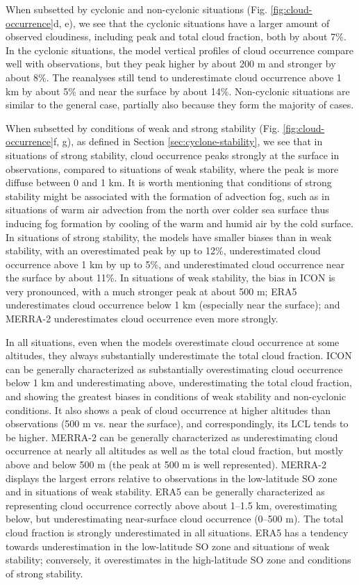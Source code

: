 \documentclass[draft]{agujournal2019}
\begin{document}
When subsetted by cyclonic and non-cyclonic situations (Fig. \ref{fig:cloud-occurrence}d, e), we see that the cyclonic situations have a larger amount of observed cloudiness, including peak and total cloud fraction, both by about 7\%. In the cyclonic situations, the model vertical profiles of cloud occurrence compare well with observations, but they peak higher by about 200 m and stronger by about 8\%. The reanalyses still tend to underestimate cloud occurrence above 1 km by about 5\% and near the surface by about 14\%. Non-cyclonic situations are similar to the general case, partially also because they form the majority of cases.

When subsetted by conditions of weak and strong stability (Fig. \ref{fig:cloud-occurrence}f, g), as defined in Section \ref{sec:cyclone-stability}, we see that in situations of strong stability, cloud occurrence peaks strongly at the surface in observations, compared to situations of weak stability, where the peak is more diffuse between 0 and 1 km. It is worth mentioning that conditions of strong stability might be associated with the formation of advection fog, such as in situations of warm air advection from the north over colder sea surface thus inducing fog formation by cooling of the warm and humid air by the cold surface. In situations of strong stability, the models have smaller biases than in weak stability, with an overestimated peak by up to 12\%, underestimated cloud occurrence above 1 km by up to 5\%, and underestimated cloud occurrence near the surface by about 11\%. In situations of weak stability, the bias in ICON is very pronounced, with a much stronger peak at about 500 m; ERA5 underestimates cloud occurrence below 1 km (especially near the surface); and MERRA-2 underestimates cloud occurrence even more strongly.

In all situations, even when the models overestimate cloud occurrence at some altitudes, they always substantially underestimate the total cloud fraction. ICON can be generally characterized as substantially overestimating cloud occurrence below 1 km and underestimating above, underestimating the total cloud fraction, and showing the greatest biases in conditions of weak stability and non-cyclonic conditions. It also shows a peak of cloud occurrence at higher altitudes than observations (500 m vs. near the surface), and correspondingly, its LCL tends to be higher. MERRA-2 can be generally characterized as underestimating cloud occurrence at nearly all altitudes as well as the total cloud fraction, but mostly above and below 500 m (the peak at 500 m is well represented). MERRA-2 displays the largest errors relative to observations in the low-latitude SO zone and in situations of weak stability. ERA5 can be generally characterized as representing cloud occurrence correctly above about 1--1.5 km, overestimating below, but underestimating near-surface cloud occurrence (0--500 m). The total cloud fraction is strongly underestimated in all situations. ERA5 has a tendency towards underestimation in the low-latitude SO zone and situations of weak stability; conversely, it overestimates in the high-latitude SO zone and conditions of strong stability.
\end{document}

